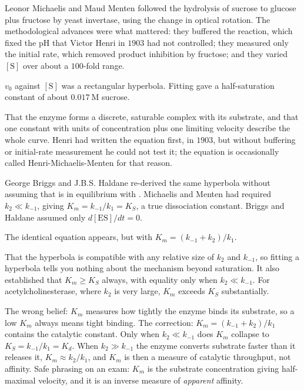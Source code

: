 \begin{expbox}[title={EXPERIMENT: Michaelis and Menten on invertase, 1913}]
 Leonor Michaelis and Maud Menten followed the hydrolysis of sucrose to
glucose plus fructose by yeast invertase, using the change in optical rotation. The
methodological advances were what mattered: they buffered the reaction, which fixed the
pH that Victor Henri in $1903$ had not controlled; they measured only the initial rate,
which removed product inhibition by fructose; and they varied $[\mathrm{S}]$ over
about a $100$-fold range.

 $v_0$ against $[\mathrm{S}]$ was a rectangular hyperbola. Fitting gave
a half-saturation constant of about $0.017\ \mathrm{M}$ sucrose.

 That the enzyme forms a discrete, saturable complex with
its substrate, and that one constant with units of concentration plus one limiting
velocity describe the whole curve. Henri had written the equation first, in $1903$, but
without buffering or initial-rate measurement he could not test it; the equation is
occasionally called Henri-Michaelis-Menten for that reason.
\end{expbox}

\begin{expbox}[title={EXPERIMENT: Briggs and Haldane, 1925, and why the assumption changed}]
 George Briggs and J.B.S. Haldane re-derived the same hyperbola without
assuming that  is in equilibrium with . Michaelis and Menten had
required $k_2\ll k_{-1}$, giving $K_m=k_{-1}/k_1=K_S$, a true dissociation constant.
Briggs and Haldane assumed only $d[\mathrm{ES}]/dt=0$.

 The identical equation appears, but with
$K_m=(k_{-1}+k_2)/k_1$.

 That the hyperbola is compatible with any relative size
of $k_2$ and $k_{-1}$, so fitting a hyperbola tells you nothing about the mechanism
beyond saturation. It also established that $K_m\geq K_S$ always, with equality only
when $k_2\ll k_{-1}$. For acetylcholinesterase, where $k_2$ is very large,
$K_m$ exceeds $K_S$ substantially.
\end{expbox}

\begin{warnbox}[title={TRAP: treating $K_m$ as a dissociation constant}]
The wrong belief: $K_m$ measures how tightly the enzyme binds its substrate, so a low
$K_m$ always means tight binding. The correction: $K_m=(k_{-1}+k_2)/k_1$ contains the
catalytic constant. Only when $k_2\ll k_{-1}$ does $K_m$ collapse to
$K_S=k_{-1}/k_1=K_d$. When $k_2\gg k_{-1}$ the enzyme converts substrate faster than
it releases it, $K_m\approx k_2/k_1$, and $K_m$ is then a measure of catalytic
throughput, not affinity. Safe phrasing on an exam: $K_m$ is the substrate
concentration giving half-maximal velocity, and it is an inverse measure of
\emph{apparent} affinity.
\end{warnbox}


